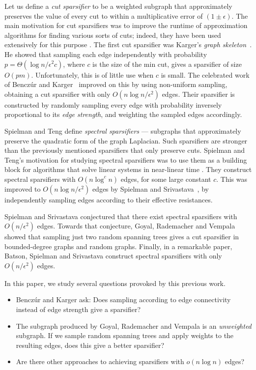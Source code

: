\documentclass[11pt]{article}
\numberwithin{equation}{section}
\begin{document}
Let us define a \textit{cut sparsifier} to be a weighted subgraph that
approximately preserves the value of every cut to within a multiplicative error of $(1\pm \epsilon)$.
The main motivation for cut sparsifiers was to improve the runtime of
approximation algorithms for finding various sorts of cuts;
indeed, they have been used extensively for this purpose \cite{KargerSkel,BKConf,AK,KRV}.
The first cut sparsifier was Karger's \textit{graph skeleton}~\cite{KargerSkelConf,KargerSkel}.
He showed that sampling each edge independently with probability $p=\Theta(\log n/\epsilon^2 c)$,
where $c$ is the size of the min cut, gives a sparsifier of size $O(pm)$.
Unfortunately, this is of little use when $c$ is small.
The celebrated work of Bencz\'ur and Karger~\cite{BKConf,BK} 
improved on this by using non-uniform sampling,
obtaining a cut sparsifier with only $O(n \log n / \epsilon^2)$ edges.
Their sparsifier is constructed by randomly sampling every edge with probability
inversely proportional to its \emph{edge strength},
and weighting the sampled edges accordingly.

Spielman and Teng \cite{STConf,ST} define \textit{spectral sparsifiers} --- subgraphs
that approximately preserve the quadratic form of the graph Laplacian.
Such sparsifiers are stronger than the previously mentioned sparsifiers that only preserve cuts.
Spielman and Teng's motivation for studying spectral sparsifiers was to use them as a building
block for algorithms that solve linear systems in near-linear time \cite{STConf,SpielmanSurvey}.
They construct spectral sparsifiers with $O( n \log^c n )$ edges, for some large constant $c$.
This was improved to $O(n \log n / \epsilon^2)$ edges by Spielman and Srivastava~\cite{SS},
by independently sampling edges according to their effective resistances.

Spielman and Srivastava conjectured that there exist spectral sparsifiers with
$O(n / \epsilon^2)$ edges.
Towards that conjecture, Goyal, Rademacher and Vempala \cite{GoyalRV09}
showed that sampling just two random spanning trees gives a cut sparsifier
in bounded-degree graphs and random graphs.
Finally, in a remarkable paper, Batson, Spielman and Srivastava \cite{BSS}
construct spectral sparsifiers with only $O(n / \epsilon^2)$ edges.

In this paper, we study several questions provoked by this previous work.
\begin{itemize}
\item Bencz\'ur and Karger ask: Does sampling according to
edge connectivity instead of edge strength give a sparsifier?
\item The subgraph produced by Goyal, Rademacher and Vempala is an \textit{unweighted}
subgraph. If we sample random spanning trees and apply weights to the resulting edges,
does this give a better sparsifier?
\item Are there other approaches to achieving sparsifiers with $o(n \log n)$ edges?
\end{itemize}
\end{document}
